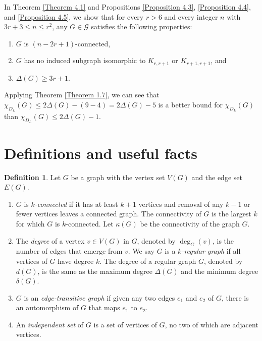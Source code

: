 \documentclass[12pt,reqno,a4paper]{amsart}
\theoremstyle{definition}
\newtheorem{defn}{Definition}[section]
\begin{document}
In Theorem \ref{Theorem 4.1} and Propositions \ref{Proposition 4.3},  \ref{Proposition 4.4}, and \ref{Proposition 4.5}, we show that for every $r>6$ and every integer $n$ with $3r+3\le n\le r^2$, any $G\in\mathcal{G}$
satisfies the following properties:

\begin{enumerate}[$(i)$]
    \item $G$ is $(n-2r+1)$-connected,
    \item $G$ has no induced subgraph isomorphic to $K_{r,r+1}$ or $K_{r+1,r+1}$, and
    \item $\Delta(G)\geq 3r+1$.
\end{enumerate}

Applying Theorem \ref{Theorem 1.7}, we can see that $\chi_{D_{L}}(G)\leq 2\Delta(G)-(9-4)=2\Delta(G)-5$ is a better bound for $\chi_{D_{L}}(G)$ than $\chi_{D_{L}}(G)\leq 2\Delta(G)-1$.

\section{Definitions and useful facts}

\begin{defn}\label{Definition 2.1}
Let $G$ be a graph with the vertex set $V(G)$ and the edge set $E(G)$.
\begin{enumerate}
\item $G$ is {\em $k$-connected} if it has at least $k+1$ vertices and removal of any $k-1$ or fewer vertices leaves a connected graph. 
The connectivity of $G$ is the largest $k$ for which $G$ is $k$-connected.
Let $\kappa(G)$ be the connectivity of the graph $G$.

\item The {\em degree} of a vertex $v \in V(G)$ in $G$, denoted by $\deg_{G}(v)$, is the number of edges that emerge from $v$.
We say $G$ is a {\em $k$-regular graph} if all vertices of $G$ have degree $k$. The degree of a regular graph $G$, denoted by $d(G)$, is the same as the maximum degree $\Delta(G)$ and the minimum degree $\delta(G)$.

\item $G$ is an {\em edge-transitive graph} if given any two edges $e_{1}$ and $e_{2}$ of $G$, there is an automorphism of $G$ that maps $e_{1}$ to $e_{2}$. 

\item An {\em independent set} of $G$ is a set of vertices of $G$, no two of which are adjacent vertices. 
\end{enumerate}
\end{defn}
\end{document}
